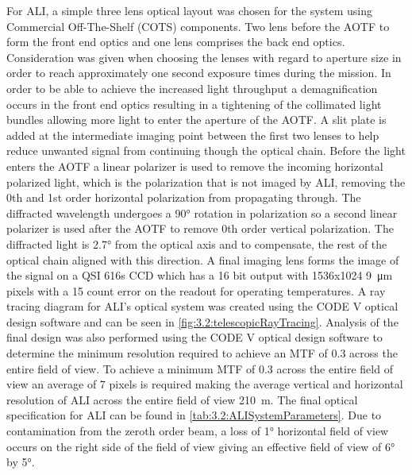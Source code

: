 \documentclass[12pt]{article}
\begin{document}
For ALI, a simple three lens optical layout was chosen for the system using Commercial Off-The-Shelf (COTS) components. Two lens before the AOTF to form the front end optics and one lens comprises the back end optics. Consideration was given when choosing the lenses with regard to aperture size in order to reach approximately one second exposure times during the mission. In order to be able to achieve the increased light throughput a demagnification occurs in the front end optics resulting in a tightening of the collimated light bundles allowing more light to enter the aperture of the AOTF. A slit plate is added at the intermediate imaging point between the first two lenses to help reduce unwanted signal from continuing though the optical chain. Before the light enters the AOTF a linear polarizer is used to remove the incoming horizontal polarized light, which is the polarization that is not imaged by ALI, removing the 0th and 1st order horizontal polarization from propagating through. The diffracted wavelength undergoes a 90\si{\degree} rotation in polarization so a second linear polarizer is used after the AOTF to remove 0th order vertical polarization. The diffracted light is 2.7\si{\degree} from the optical axis and to compensate, the rest of the optical chain aligned with this direction. A final imaging lens forms the image of the signal on a QSI 616s CCD which has a 16 bit output with 1536x1024 9~\si{\micro\metre} pixels with a 15 count error on the readout for operating temperatures. A ray tracing diagram for ALI's optical system was created using the CODE V optical design software and can be seen in \autoref{fig:3.2:telescopicRayTracing}. Analysis of the final design was also performed using the CODE V optical design software to determine the minimum resolution required to achieve an MTF of 0.3 across the entire field of view. To achieve a minimum MTF of 0.3 across the entire field of view an average of 7 pixels is required making the average vertical and horizontal resolution of ALI across the entire field of view 210~m. The final optical specification for ALI can be found in \autoref{tab:3.2:ALISystemParameters}. Due to contamination from the zeroth order beam, a loss of 1\si{\degree} horizontal field of view occurs on the right side of the field of view giving an effective field of view of 6\si{\degree} by 5\si{\degree}.
\end{document}
